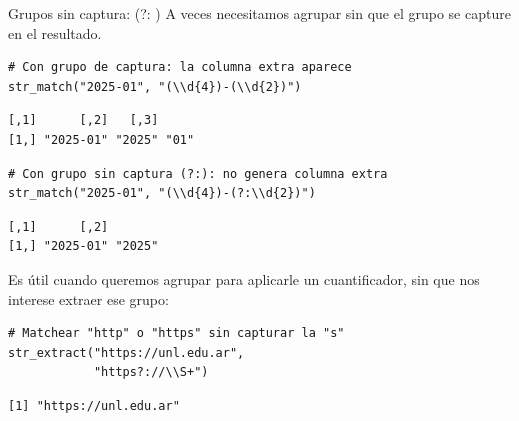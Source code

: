 \documentclass[8pt]{beamer}
\begin{document}
\begin{frame}[fragile]{Grupos sin captura: (?: )}
	A veces necesitamos agrupar sin que el grupo se capture en el resultado.
\begin{lstlisting}[style=RScript]
# Con grupo de captura: la columna extra aparece
str_match("2025-01", "(\\d{4})-(\\d{2})")
\end{lstlisting}
\begin{lstlisting}[style=RConsole]
     [,1]      [,2]   [,3]
[1,] "2025-01" "2025" "01"
\end{lstlisting}
\begin{lstlisting}[style=RScript]
# Con grupo sin captura (?:): no genera columna extra
str_match("2025-01", "(\\d{4})-(?:\\d{2})")
\end{lstlisting}
\begin{lstlisting}[style=RConsole]
     [,1]      [,2]
[1,] "2025-01" "2025"
\end{lstlisting}

	Es útil cuando queremos agrupar para aplicarle un cuantificador, sin que nos interese extraer ese grupo:
\begin{lstlisting}[style=RScript]
# Matchear "http" o "https" sin capturar la "s"
str_extract("https://unl.edu.ar",
            "https?://\\S+")
\end{lstlisting}
\begin{lstlisting}[style=RConsole]
[1] "https://unl.edu.ar"
\end{lstlisting}
\end{frame}
\end{document}
